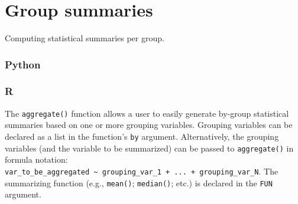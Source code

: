 \documentclass[
]{book}
\newenvironment{Shaded}{\begin{snugshade}}{\end{snugshade}}
\newcommand{\AttributeTok}[1]{\textcolor[rgb]{0.77,0.63,0.00}{#1}}
\newcommand{\DecValTok}[1]{\textcolor[rgb]{0.00,0.00,0.81}{#1}}
\newcommand{\FunctionTok}[1]{\textcolor[rgb]{0.00,0.00,0.00}{#1}}
\newcommand{\NormalTok}[1]{#1}
\newcommand{\SpecialCharTok}[1]{\textcolor[rgb]{0.00,0.00,0.00}{#1}}
\begin{document}
\begin{Shaded}
\end{Shaded}

\hypertarget{group-summaries}{%
\section{Group summaries}\label{group-summaries}}

Computing statistical summaries per group.

\hypertarget{python-32}{%
\subsubsection*{Python}\label{python-32}}

\hypertarget{r-32}{%
\subsubsection*{R}\label{r-32}}

The \texttt{aggregate()} function allows a user to easily generate by-group statistical summaries based on one or more grouping variables. Grouping variables can be declared as a list in the function's \texttt{by} argument. Alternatively, the grouping variables (and the variable to be summarized) can be passed to \texttt{aggregate()} in formula notation: \texttt{var\_to\_be\_aggregated\ \textasciitilde{}\ grouping\_var\_1\ +\ ...\ +\ grouping\_var\_N}. The summarizing function (e.g., \texttt{mean()}; \texttt{median()}; etc.) is declared in the \texttt{FUN} argument.
\end{document}
